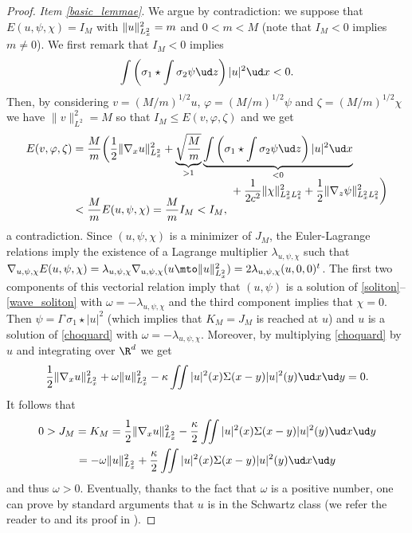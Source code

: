 \begin{proof}
\textit{Item \eqref{basic_lemmae}}. We argue by contradiction: we suppose that $E(u,\psi,\chi)=I_{M}$ with $\|u\|_{L_{x}^{2}}^{2}=\nobreak m$ and $0<m<M$ (note that $I_{M}<0$ implies $m\neq 0$). We first remark that $I_{M}<0$ implies
\[
\int\left(\sigma_{1}\star\int\sigma_{2}\psi\ud z\right)|u|^{2}\ud x<0.
\]
Then, by considering $v=(M/m)^{1/2}u$, $\varphi=(M/m)^{1/2}\psi$ and $\zeta=(M/m)^{1/2}\chi$ we
have $\|v\|_{L^2}^2=M$ so that $I_{M}\leq E(v,\varphi,\zeta)$
and we get\vspace*{-3pt}
\begin{align*}
E(v,\varphi,\zeta)
&=\frac{M}{m}\biggl(\frac{1}{2}\|\nabla_{x}u\|_{L_{x}^{2}}^{2}+\underbrace{\sqrt{\frac{M}{m}}}_{>1}\underbrace{\int\left(\sigma_{1}\star\int\sigma_{2}\psi\ud z\right)|u|^{2}\ud x}_{<0}
\\[
-5pt]
&\hspace*{5cm}+\frac{1}{2c^{2}}\|\chi\|_{L_{x}^{2}L_{z}^{2}}^{2}+\frac{1}{2}\|\nabla_{z}\psi\|_{L_{x}^{2}L_{z}^{2}}^{2}\biggr)\\[
-10pt]
& <\frac{M}{m}E(u,\psi,\chi)=\frac{M}{m}I_{M}<I_{M},
\end{align*}
a contradiction. Since $(u,\psi,\chi)$ is a minimizer of $J_{M}$, the Euler-Lagrange relations imply the existence of a Lagrange multiplier $\lambda_{u,\psi,\chi}$ such that $\nabla_{u,\psi,\chi}E(u,\psi,\chi)=\lambda_{u,\psi,\chi}\nabla_{u,\psi,\chi}(u\mto\|u\|_{L_{x}^{2}}^{2})=2\lambda_{u,\psi,\chi}(u,0,0)^{t}$. The first two components of this vectorial relation imply that $(u,\psi)$ is a solution of \eqref{soliton}--\eqref{wave_soliton} with $\omega=-\lambda_{u,\psi,\chi}$ and the third component implies that $\chi=0$. Then $\psi=\Gamma\,\sigma_{1}\star|u|^{2}$ (which implies that $K_{M}=J_{M}$ is reached at $u$) and $u$ is a solution of \eqref{choquard} with $\omega=-\lambda_{u,\psi,\chi}$. Moreover, by multiplying \eqref{choquard} by $u$ and integrating over $\R^{d}$ we get\vspace*{-3pt}
\[
\frac{1}{2}\|\nabla_{x}u\|_{L_{x}^{2}}^{2}+\omega\|u\|_{L_{x}^{2}}^{2}-\kappa\iint|u|^{2}(x)\Sigma(x-y)|u|^{2}(y)\ud x\ud y=0.
\]
It follows that\vspace*{-5pt}
\begin{multline*}
0>J_{M}=K_{M}=\frac{1}{2}\|\nabla_{x}u\|_{L_{x}^{2}}^{2}-\frac{\kappa}{2}\iint|u|^{2}(x)\Sigma(x-y)|u|^{2}(y)\ud x\ud y\\
=-\omega\|u\|_{L_{x}^{2}}^{2}+\frac{\kappa}{2}\iint|u|^{2}(x)\Sigma(x-y)|u|^{2}(y)\ud x\ud y
\end{multline*}
and thus $\omega>0$. Eventually, thanks to the fact that $\omega$ is a positive number, one can prove by standard arguments that $u$ is in the Schwartz class (we refer the reader to \cite[Th.\,8]{Lieb_Choquard} and its proof in \cite[Rem.\,1]{Lions_Choquard}).


\end{proof}
